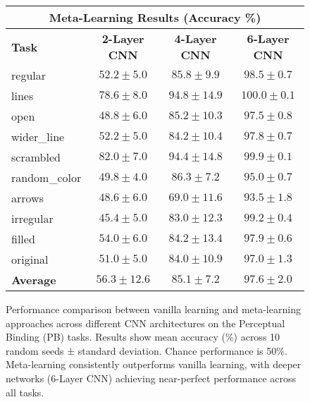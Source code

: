 \begin{figure}[t]
\begin{tabular}{|l|c|c|c|}
\hline
\multicolumn{4}{|c|}{\textbf{Meta-Learning Results (Accuracy \%)}} \\
\hline
\textbf{Task} & \textbf{2-Layer CNN} & \textbf{4-Layer CNN} & \textbf{6-Layer CNN} \\
\hline
regular & $52.2 \pm 5.0$ & $85.8 \pm 9.9$ & $98.5 \pm 0.7$ \\
lines & $78.6 \pm 8.0$ & $94.8 \pm 14.9$ & $\mathbf{100.0 \pm 0.1}$ \\
open & $48.8 \pm 6.0$ & $85.2 \pm 10.3$ & $97.5 \pm 0.8$ \\
wider\_line & $52.2 \pm 5.0$ & $84.2 \pm 10.4$ & $97.8 \pm 0.7$ \\
scrambled & $82.0 \pm 7.0$ & $94.4 \pm 14.8$ & $99.9 \pm 0.1$ \\
random\_color & $49.8 \pm 4.0$ & $86.3 \pm 7.2$ & $95.0 \pm 0.7$ \\
arrows & $48.6 \pm 6.0$ & $69.0 \pm 11.6$ & $93.5 \pm 1.8$ \\
irregular & $45.4 \pm 5.0$ & $83.0 \pm 12.3$ & $99.2 \pm 0.4$ \\
filled & $54.0 \pm 6.0$ & $84.2 \pm 13.4$ & $97.9 \pm 0.6$ \\
original & $51.0 \pm 5.0$ & $84.0 \pm 10.9$ & $97.0 \pm 1.3$ \\
\hline
\textbf{Average} & $56.3 \pm 12.6$ & $85.1 \pm 7.2$ & $97.6 \pm 2.0$ \\
\hline
\end{tabular}
\caption{Performance comparison between vanilla learning and meta-learning approaches across different CNN architectures on the Perceptual Binding (PB) tasks. Results show mean accuracy (\%) across 10 random seeds ± standard deviation. Chance performance is 50\%. Meta-learning consistently outperforms vanilla learning, with deeper networks (6-Layer CNN) achieving near-perfect performance across all tasks.}
\label{tab:pb_performance}
\end{figure} 